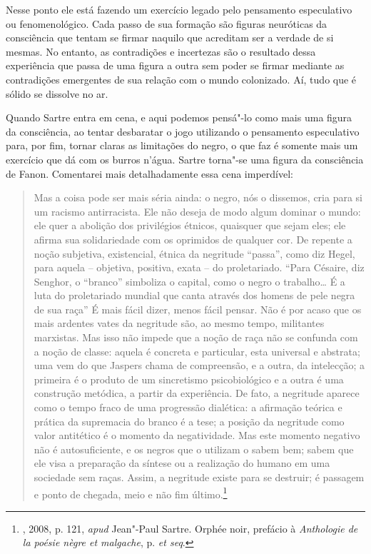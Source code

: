 Nesse ponto ele está fazendo um exercício legado pelo pensamento
especulativo ou fenomenológico. Cada passo de sua formação são figuras
neuróticas da consciência que tentam se firmar naquilo que acreditam ser
a verdade de si mesmas. No entanto, as contradições e incertezas são o
resultado dessa experiência que passa de uma figura a outra sem poder se
firmar mediante as contradições emergentes de sua relação com o mundo
colonizado. Aí, tudo que é sólido se dissolve no ar.

Quando Sartre entra em cena, e aqui podemos pensá"-lo como mais uma
figura da consciência, ao tentar desbaratar o jogo utilizando o
pensamento especulativo para, por fim, tornar claras as limitações do
negro, o que faz é somente mais um exercício que dá com os burros
n'água. Sartre torna"-se uma figura da consciência de Fanon. Comentarei
mais detalhadamente essa cena imperdível:

\begin{quote}
Mas a coisa pode ser mais séria ainda: o negro, nós o dissemos, cria
para si um racismo antirracista. Ele não deseja de modo algum dominar o
mundo: ele quer a abolição dos privilégios étnicos, quaisquer que sejam
eles; ele afirma sua solidariedade com os oprimidos de qualquer cor. De
repente a noção subjetiva, existencial, étnica da negritude ``passa'',
como diz Hegel, para aquela -- objetiva, positiva, exata -- do
proletariado. ``Para Césaire, diz Senghor, o ``branco'' simboliza o
capital, como o negro o trabalho\ldots{} É a luta do proletariado mundial que
canta através dos homens de pele negra de sua raça'' É mais fácil
dizer, menos fácil pensar. Não é por acaso que os mais ardentes vates da
negritude são, ao mesmo tempo, militantes marxistas. Mas isso não impede
que a noção de raça não se confunda com a noção de classe: aquela é
concreta e particular, esta universal e abstrata; uma vem do que Jaspers
chama de compreensão, e a outra, da intelecção; a primeira é o produto
de um sincretismo psicobiológico e a outra é uma construção metódica, a
partir da experiência. De fato, a negritude aparece como o tempo fraco
de uma progressão dialética: a afirmação teórica e prática da supremacia
do branco é a tese; a posição da negritude como valor antitético é o
momento da negatividade. Mas este momento negativo não é
autosuficiente, e os negros que o utilizam o sabem bem; sabem que ele
visa a preparação da síntese ou a realização do humano em uma sociedade
sem raças. Assim, a negritude existe para se destruir; é passagem e
ponto de chegada, meio e não fim último.\footnote{, 2008, p. 121,
  \emph{apud} Jean"-Paul Sartre. Orphée noir, prefácio à \emph{Anthologie de la
  poésie nègre et malgache}, p.  \emph{et seq}.}
\end{quote}

